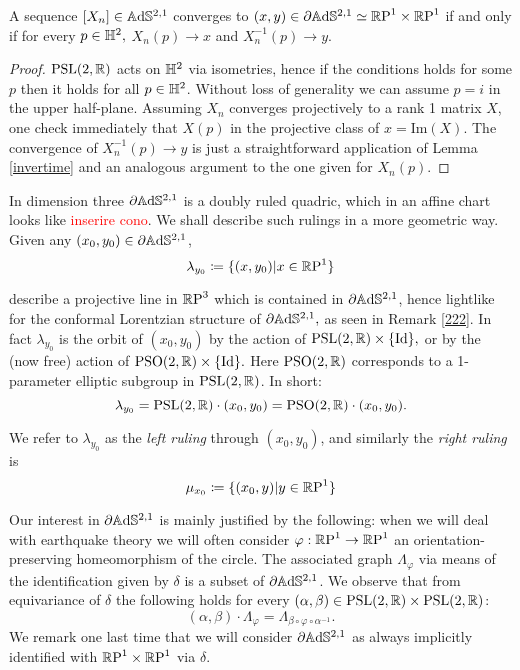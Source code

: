 \begin{lemma}\label{convergenza}
    A sequence $[X_n]\in\A^{2,1}$ converges to $(x,y)\in\partial\A^{2,1}\simeq\T$ if and only if for every $p\in\H^2,$ $X_n(p)\to x$ and $X_n^{-1}(p)\to y.$ 
\end{lemma}
\begin{proof}
    $\PSL$ acts on $\H^2$ via isometries, hence if the conditions holds for some $p$ then it holds for all $p\in\H^2$. Without loss of generality we can assume $p=i$ in the upper half-plane. Assuming $X_n$ converges projectively to a rank 1 matrix $X$, one check immediately that $X(p)$ in the projective class of $x=\text{Im}(X).$ The convergence of $X_n^{-1}(p)\to y$ is just a straightforward application of Lemma \ref{invertime} and an analogous argument to the one given for $X_n(p)$.
\end{proof}

In dimension three $\partial\A^{2,1}$ is a doubly ruled quadric, which in an affine chart looks like \textcolor{red}{inserire cono}. We shall describe such rulings in a more geometric way. Given any $(x_0,y_0)\in\partial\A^{2,1}$, 
\begin{equation}\label{ruling}
        \lambda_{y_0}\coloneqq\{(x,y_0)|x\in\R\text{P}^1\}
\end{equation}

describe a projective line in $\R\text{P}^3$ which is contained in $\partial\A^{2,1}$, hence lightlike for the conformal Lorentzian structure of $\partial\A^{2,1},$ as seen in Remark \ref{222}. In fact $\lambda_{y_0}$ is the orbit of $(x_0,y_0)$ by the action of $\PSL\times\{\text{Id}\},$ or by the (now free) action of $\text{PSO}(2,\R)\times\{\text{Id}\}.$ Here $\text{PSO}(2,\R)$ corresponds to a 1-parameter elliptic subgroup in $\PSL$. In short: 
\[
    \lambda_{y_0}=\PSL\cdot(x_0,y_0)=\text{PSO}(2,\R)\cdot(x_0,y_0).
\]

We refer to $\lambda_{y_0}$ as the \textit{left ruling} through $(x_0,y_0)$, and similarly the \textit{right ruling} is 
\[
    \mu_{x_0}\coloneqq\{(x_0,y)|y\in\R\text{P}^1\}
\]

Our interest in $\partial\A^{2,1}$ is mainly justified by the following: when we will deal with earthquake theory we will often consider $\varphi:\S\to\S$ an orientation-preserving homeomorphism of the circle. The associated graph $\Lambda_\varphi$ via means of the identification given by $\delta$ is a subset of $\partial\A^{2,1}$. We observe that from equivariance of $\delta$ the following holds for every $(\alpha,\beta)\in\PSL\times\PSL$: 
\begin{equation}\label{graphequivariancy}
(\alpha,\beta)\cdot\Lambda_\varphi=\Lambda_{\beta\circ\varphi\circ\alpha^{-1}}.
\end{equation}
We remark one last time that we will consider $\partial\A^{2,1}$ as always implicitly identified with $\T$ via $\delta$.

